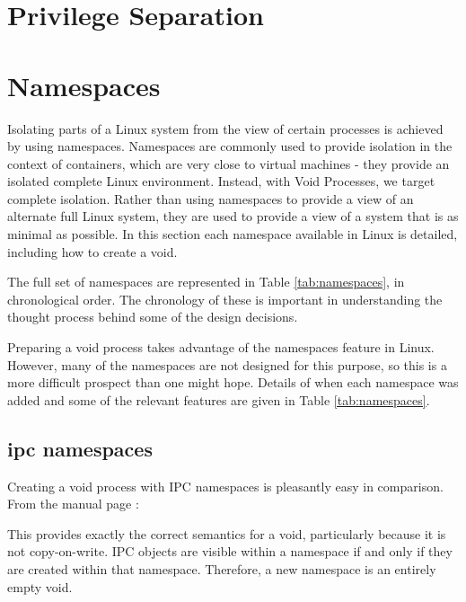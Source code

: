 \documentclass[sigplan]{acmart}
\begin{document}
\section{Privilege Separation}



\section{Namespaces}

Isolating parts of a Linux system from the view of certain processes is achieved by using namespaces. Namespaces are commonly used to provide isolation in the context of containers, which are very close to virtual machines - they provide an isolated complete Linux environment. Instead, with Void Processes, we target complete isolation. Rather than using namespaces to provide a view of an alternate full Linux system, they are used to provide a view of a system that is as minimal as possible. In this section each namespace available in Linux is detailed, including how to create a void.

The full set of namespaces are represented in Table \ref{tab:namespaces}, in chronological order. The chronology of these is important in understanding the thought process behind some of the design decisions.

Preparing a void process takes advantage of the namespaces feature in Linux. However, many of the namespaces are not designed for this purpose, so this is a more difficult prospect than one might hope. Details of when each namespace was added and some of the relevant features are given in Table \ref{tab:namespaces}.

\subsection{ipc namespaces}

Creating a void process with IPC namespaces is pleasantly easy in comparison. From the manual page \citep{free_software_foundation_ipc_namespaces7_2021}:


This provides exactly the correct semantics for a void, particularly because it is not copy-on-write. IPC objects are visible within a namespace if and only if they are created within that namespace. Therefore, a new namespace is an entirely empty void.
\end{document}
